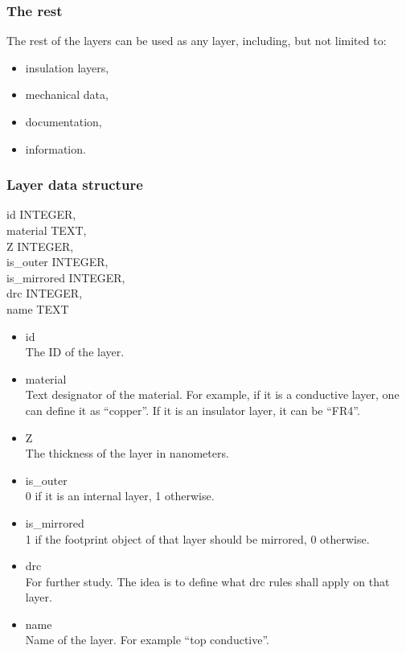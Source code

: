 \documentclass[12pt]{article}
\begin{document}
\subsubsection{The rest}\label{the-rest}

The rest of the layers can be used as any layer, including, but not
limited to:

\begin{itemize}
\item
  insulation layers,
\item
  mechanical data,
\item
  documentation,
\item
  information.
\end{itemize}

\subsubsection{Layer data structure}\label{layer-data-structure}

id INTEGER,\\
material TEXT,\\
Z INTEGER,\\
is\_outer INTEGER,\\
is\_mirrored INTEGER,\\
drc INTEGER,\\
name TEXT

\begin{itemize}
\item
  id\\ The ID of the layer.
\item
  material\\ Text designator of the material. For example, if it is a
  conductive layer, one can define it as ``copper''. If it is an
  insulator layer, it can be ``FR4''.
\item
  Z\\ The thickness of the layer in nanometers.
\item
  is\_outer\\ 0 if it is an internal layer, 1 otherwise.
\item
  is\_mirrored\\ 1 if the footprint object of that layer should be
  mirrored, 0 otherwise.
\item
  drc\\ For further study. The idea is to define what drc rules shall
  apply on that layer.
\item
  name\\ Name of the layer. For example ``top conductive''.
\end{itemize}
\end{document}
